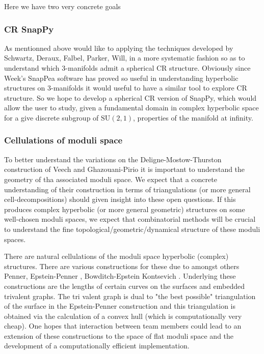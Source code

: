 \documentclass[14pt,fleqn]{article}
\begin{document}
Here we have two very concrete goals

\subsubsection{CR SnapPy}
As mentionned above would like to applying the  techniques developed 
by Schwartz, Deraux, Falbel, Parker, Will, in a
more systematic fashion so as to understand
which 3-manifolds admit a spherical CR structure.
Obviously since Week's SnapPea software 
has proved so useful in understanding 
hyperbolic structures on 3-manifolds
it would useful to have a similar tool
to explore CR structure.
So we hope to develop a spherical CR version of SnapPy,
which would allow the user to study, 
given a fundamental domain 
in complex hyperbolic space  for a
give discrete subgroup of $\mathrm{SU}(2,1)$, properties of the  manifold at infinity.


\subsubsection{Cellulations of moduli space}

To better understand the variations 
on the Deligne-Mostow-Thurston construction
of  Veech and Ghazouani-Pirio
it is important to understand the geometry
of tha associated moduli space.
We expect that a concrete understanding of their construction in terms of triangulations (or more general cell-decompositions) should given
insight into these open questions. 
If this produces complex hyperbolic
(or more general geometric) structures on some well-chosen moduli spaces, we expect that combinatorial methods will be crucial to understand the fine topological/geometric/dynamical structure of these
moduli spaces.

There are  natural cellulations of 
the moduli space hyperbolic (complex)  structures.
There are various constructions for these
due to amongst others Penner, 
Epstein-Penner \cite{epstein1988}, 
Bowditch-Epstein \cite{BOWDITCH198891} Kontsevich \cite{kontsevich1992}.
Underlying these constructions 
are the lengths of certain curves on the surfaces
and embedded trivalent graphs.
The tri valent graph is dual to 
"the best possible" triangulation of the surface
in the Epstein-Penner construction
and this triangulation is obtained 
via the calculation of a convex hull
(which is computationally very cheap).
One hopes that interaction between team members
could lead to an extension of these constructions
to the space of flat moduli space 
and the development of a computationally efficient implementation.
 
\end{document}
